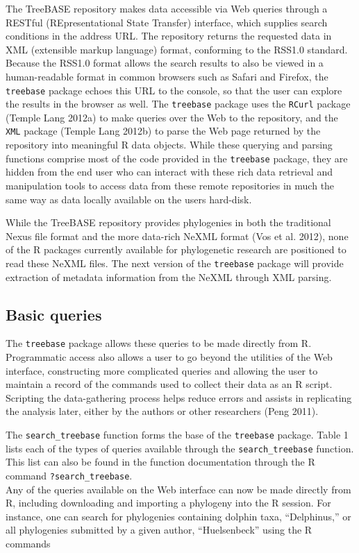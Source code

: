\documentclass[author-year, 8pt, 3p]{elsarticle} %
\begin{document}
The TreeBASE repository makes data accessible via Web queries through a
RESTful (REpresentational State Transfer) interface, which supplies
search conditions in the address URL. The repository returns the
requested data in XML (extensible markup language) format, conforming to
the RSS1.0 standard. Because the RSS1.0 format allows the search results
to also be viewed in a human-readable format in common browsers such as
Safari and Firefox, the \texttt{treebase} package echoes this URL to the
console, so that the user can explore the results in the browser as
well. The \texttt{treebase} package uses the \texttt{RCurl} package
(Temple Lang 2012a) to make queries over the Web to the repository, and
the \texttt{XML} package (Temple Lang 2012b) to parse the Web page
returned by the repository into meaningful R data objects. While these
querying and parsing functions comprise most of the code provided in the
\texttt{treebase} package, they are hidden from the end user who can
interact with these rich data retrieval and manipulation tools to access
data from these remote repositories in much the same way as data locally
available on the users hard-disk.

While the TreeBASE repository provides phylogenies in both the
traditional Nexus file format and the more data-rich NeXML format (Vos
et al. 2012), none of the R packages currently available for
phylogenetic research are positioned to read these NeXML files. The next
version of the \texttt{treebase} package will provide extraction of
metadata information from the NeXML through XML parsing.

\subsection{Basic queries}

The \texttt{treebase} package allows these queries to be made directly
from R. Programmatic access also allows a user to go beyond the
utilities of the Web interface, constructing more complicated queries
and allowing the user to maintain a record of the commands used to
collect their data as an R script. Scripting the data-gathering process
helps reduce errors and assists in replicating the analysis later,
either by the authors or other researchers (Peng 2011).

The \texttt{search\_treebase} function forms the base of the
\texttt{treebase} package. Table 1 lists each of the types of queries
available through the \texttt{search\_treebase} function. This list can
also be found in the function documentation through the R command
\texttt{?search\_treebase}.\\Any of the queries available on the Web
interface can now be made directly from R, including downloading and
importing a phylogeny into the R session. For instance, one can search
for phylogenies containing dolphin taxa, ``Delphinus,'' or all
phylogenies submitted by a given author, ``Huelsenbeck'' using the R
commands
\end{document}
